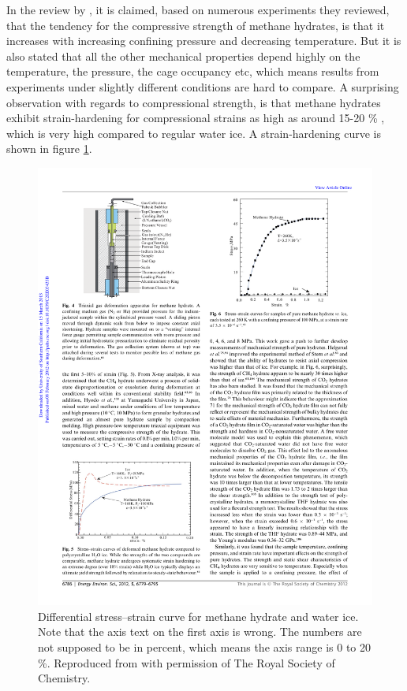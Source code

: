 In the review by \citet{Ning2012}, it is claimed, based on numerous experiments they reviewed, that the tendency for the compressive strength of methane hydrates, is that it increases with increasing confining pressure and decreasing temperature. But it is also stated that all the other mechanical properties depend highly on the temperature, the pressure, the cage occupancy etc, which means results from experiments under slightly different conditions are hard to compare. A surprising observation with regards to compressional strength, is that methane hydrates exhibit strain-hardening for compressional strains as high as around 15-20 \% \cite{Durham2003, Stern1998}, which is very high compared to regular water ice. A strain-hardening curve is shown in figure \ref{fig:strain_hardening}.

\begin{figure}
\centering
\includegraphics[width=12cm]{../pictures/differential_stress_hydrate.pdf}
\caption{Differential stress–strain curve for methane hydrate and water ice. Note that the axis text on the first axis is wrong. The numbers are not supposed to be in percent, which means the axis range is 0 to 20 \%. Reproduced from \cite{Ning2012} with permission of The Royal Society of Chemistry.}
\label{fig:strain_hardening}
\end{figure}

